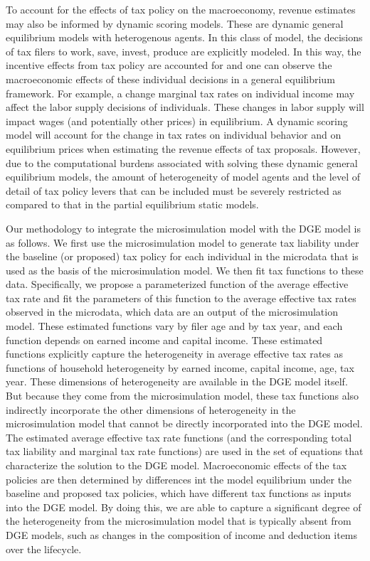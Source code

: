 \documentclass[letterpaper,12pt]{article}
\theoremstyle{definition}
\begin{document}
\begin{spacing}{1.5}
  To account for the effects of tax policy on the macroeconomy, revenue estimates may also be informed by dynamic scoring models. These are dynamic general equilibrium models with heterogenous agents. In this class of model, the decisions of tax filers to work, save, invest, produce are explicitly modeled. In this way, the incentive effects from tax policy are accounted for and one can observe the macroeconomic effects of these individual decisions in a general equilibrium framework. For example, a change marginal tax rates on individual income may affect the labor supply decisions of individuals. These changes in labor supply will impact wages (and potentially other prices) in equilibrium. A dynamic scoring model will account for the change in tax rates on individual behavior and on equilibrium prices when estimating the revenue effects of tax proposals. However, due to the computational burdens associated with solving these dynamic general equilibrium models, the amount of heterogeneity of model agents and the level of detail of tax policy levers that can be included must be severely restricted as compared to that in the partial equilibrium static models.

  Our methodology to integrate the microsimulation model with the DGE model is as follows. We first use the microsimulation model to generate tax liability under the baseline (or proposed) tax policy for each individual in the microdata that is used as the basis of the microsimulation model. We then fit tax functions to these data.  Specifically, we propose a parameterized function of the average effective tax rate and fit the parameters of this function to the average effective tax rates observed in the microdata, which data are an output of the microsimulation model. These estimated functions vary by filer age and by tax year, and each function depends on earned income and capital income. These estimated functions explicitly capture the heterogeneity in average effective tax rates as functions of household heterogeneity by earned income, capital income, age, tax year. These dimensions of heterogeneity are available in the DGE model itself.  But because they come from the microsimulation model, these tax functions also indirectly incorporate the other dimensions of heterogeneity in the microsimulation model that cannot be directly incorporated into the DGE model. The estimated average effective tax rate functions (and the corresponding total tax liability and marginal tax rate functions) are used in the set of equations that characterize the solution to the DGE model. Macroeconomic effects of the tax policies are then determined by differences int the model equilibrium under the baseline and proposed tax policies, which have different tax functions as inputs into the DGE model. By doing this, we are able to capture a significant degree of the heterogeneity from the microsimulation model that is typically absent from DGE models, such as changes in the composition of income and deduction items over the lifecycle.


\end{spacing}
\end{document}
